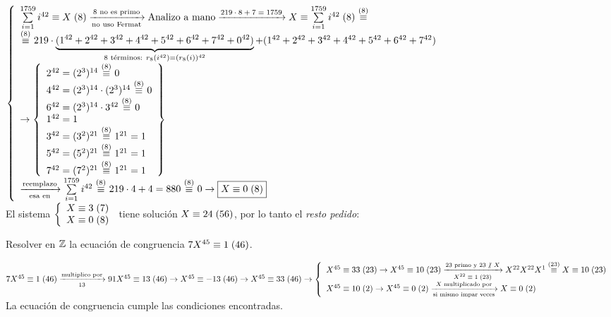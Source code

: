 \documentclass[12pt,a4paper, spanish]{article}
\begin{document}
\begin{enumerate}[label=\roman*)]
	      $\llave{l}
		      {
			      \congruencia{\sumLocal i^{42}}{X}{8}
			      \flecha{8 no es primo}[no uso Fermat]
			      \text{Analizo a mano}
			      \flecha{$219 \cdot 8 + 7 = 1759$}
			      \congruencia{X}{\sumLocal i^{42}}{8} \conga8
			      \\
			      \conga8 219 \cdot \ub{(1^{42} + 2^{42} + 3^{42} + 4^{42} + 5^{42} + 6^{42} + 7^{42} + 0^{42})}{\text{8 términos: } r_8(i^{42}) = (r_8(i))^{42} }
			      + (1^{42} + 2^{42} + 3^{42} + 4^{42} + 5^{42} + 6^{42} + 7^{42}) \\
			      \to
			      \llaves{l}{
				      2^{42} = (2^3)^{14}\conga8 0\\
				      4^{42} = (2^3)^{14} \cdot (2^3)^{14}\conga8 0\\
				      6^{42} = (2^3)^{14} \cdot 3^{42} \conga8 0\\
				      1^{42} = 1\\
				      3^{42} = (3^2)^{21} \conga8 1^{21} = 1\\
				      5^{42} = (5^2)^{21} \conga8 1^{21} = 1\\
				      7^{42} = (7^2)^{21} \conga8 1^{21} = 1
			      }\\
			      \flecha{reemplazo}[esa en]
			      \sumLocal i^{42} \conga8 219 \cdot 4 + 4  = 880 \conga8 0 \to \boxed{\congruencia{X}{0}{8}}\\
		      }$\\
	      El sistema
	      $\llave{l}{
			      \congruencia{X}{3}{7} \\
			      \congruencia{X}{0}{8} \\
		      }$ tiene solución $\congruencia{X}{24}{56}$, por lo tanto el \textit{resto pedido}: 
\end{enumerate}




\setcounter{ejercicio}{21}
\ejercicio
Resolver en $\enteros$ la ecuación de congruencia $\congruencia{7X^{45}}{1}{46}$.

\separadorCorto
$\congruencia{7X^{45}}{1}{46}
	\flecha{multiplico por}[13]
	\congruencia{91X^{45}}{13}{46}
	\to \congruencia{X^{45}}{-13}{46}
	\to \congruencia{X^{45}}{33}{46}\\
	\to
	\llave{l}{
		\congruencia{X^{45}}{33}{23} \to\congruencia{X^{45}}{10}{23} 
		\flecha{23 primo y $23\noDivide X$}[$\congruencia{X^{22}}{1}{23}$]
		X^{22} X^{22} X^{1} \conga{23} \congruencia{X}{10}{23}\\

		\congruencia{X^{45}}{10}{2} \to  \congruencia{X^{45}}{0}{2}
		\flecha{$X$ multiplicado por}[si mismo impar veces]
		\congruencia{X}{0}{2}\\
	}
$\\
  La ecuación de congruencia  cumple las condiciones encontradas.
\end{document}
